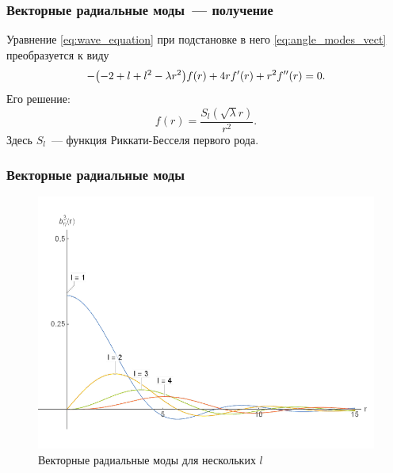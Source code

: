 \documentclass{beamer}
\begin{document}

    \begin{frame}\frametitle{Векторные радиальные моды~--- получение}

        Уравнение \autoref{eq:wave_equation} при подстановке в него \autoref{eq:angle_modes_vect} преобразуется к виду
        \begin{equation}
            - \qty(-2 + l + l^2 - \lambda r^2) f(r) +
            4 r f'(r) + r^2 f''(r) = 0 .
        \end{equation}
        Его решение:
        \begin{equation}
            f(r) = \frac{S_l(\sqrt\lambda r)}{r^2} .
        \end{equation}
        Здесь $S_l$~--- функция Риккати-Бесселя первого рода.

    \end{frame}


    \begin{frame}\frametitle{Векторные радиальные моды}

        \begin{figure}[h]
            \centering
            \includegraphics[width=\textwidth,height=0.6\textheight,keepaspectratio]{radial_modes_vect_ii}
            \caption[]{Векторные радиальные моды для нескольких $l$}
            \label{fig:radial_modes_vect_ii}
        \end{figure}

    \end{frame}
\end{document}
